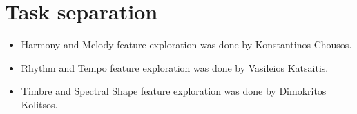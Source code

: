 \documentclass[
  letterpaper,
  twocolumn]{article}
\providecommand{\tightlist}{%
  \setlength{\itemsep}{0pt}\setlength{\parskip}{0pt}}
\begin{document}
\section{Task separation}\label{task-separation}

\begin{itemize}
\tightlist
\item
  Harmony and Melody feature exploration was done by Konstantinos
  Chousos.
\item
  Rhythm and Tempo feature exploration was done by Vasileios Katsaitis.
\item
  Timbre and Spectral Shape feature exploration was done by Dimokritos
  Kolitsos.
\end{itemize}

\printbibliography
\end{document}
